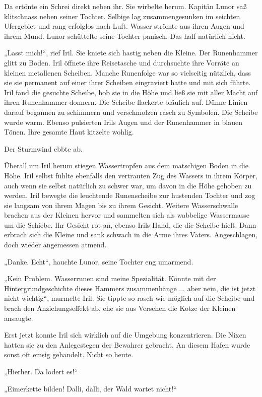 Da ertönte ein Schrei direkt neben ihr. Sie wirbelte herum. Kapitän Lunor saß klitschnass neben seiner Tochter. Selbige lag zusammengesunken im seichten Ufergebiet und rang erfolglos nach Luft. Wasser strömte aus ihren Augen und ihrem Mund. Lunor schüttelte seine Tochter panisch. Das half natürlich nicht.

„Lasst mich!“, rief Iril. Sie kniete sich hastig neben die Kleine. Der Runenhammer glitt zu Boden. Iril öffnete ihre Reisetasche und durchsuchte ihre Vorräte an kleinen metallenen Scheiben. Manche Runenfolge war so vielseitig nützlich, dass sie sie permanent auf einer ihrer Scheiben eingraviert hatte und mit sich führte. Iril fand die gesuchte Scheibe, hob sie in die Höhe und ließ sie mit aller Macht auf ihren Runenhammer donnern. Die Scheibe flackerte bläulich auf. Dünne Linien darauf begannen zu schimmern und verschmolzen rasch zu Symbolen. Die Scheibe wurde warm. Ebenso pulsierten Irils Augen und der Runenhammer in blauen Tönen. Ihre gesamte Haut kitzelte wohlig.

Der Sturmwind ebbte ab.

Überall um Iril herum stiegen Wassertropfen aus dem matschigen Boden in die Höhe. Iril selbst fühlte ebenfalls den vertrauten Zug des Wassers in ihrem Körper, auch wenn sie selbst natürlich zu schwer war, um davon in die Höhe gehoben zu werden. Iril bewegte die leuchtende Runenscheibe zur hustenden Tochter und zog sie langsam von ihrem Magen bis zu ihrem Gesicht. Weitere Wasserschwalle brachen aus der Kleinen hervor und sammelten sich als wabbelige Wassermasse um die Schiebe. Ihr Gesicht rot an, ebenso Irils Hand, die die Scheibe hielt. Dann erbrach sich die Kleine und sank schwach in die Arme ihres Vaters. Angeschlagen, doch wieder angemessen atmend.

„Danke. Echt“, hauchte Lunor, seine Tochter eng umarmend.

„Kein Problem. Wasserrunen sind meine Spezialität. Könnte mit der Hintergrundgeschichte dieses Hammers zusammenhänge ... aber nein, die ist jetzt nicht wichtig“, murmelte Iril. Sie tippte so rasch wie möglich auf die Scheibe und brach den Anziehungseffekt ab, ehe sie aus Versehen die Kotze der Kleinen ansaugte.

Erst jetzt konnte Iril sich wirklich auf die Umgebung konzentrieren. Die Nixen hatten sie zu den Anlegestegen der Bewahrer gebracht. An diesem Hafen wurde sonst oft emsig gehandelt. Nicht so heute.

„Hierher. Da lodert es!“

„Eimerkette bilden! Dalli, dalli, der Wald wartet nicht!“

